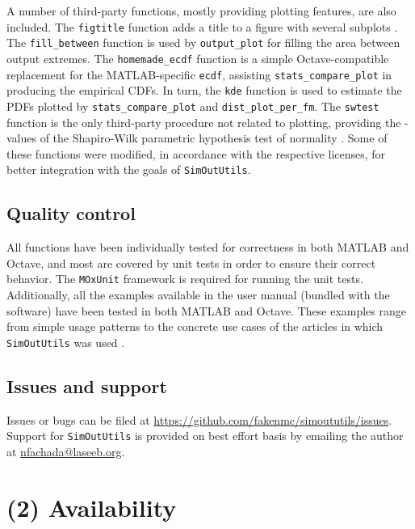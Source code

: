 \documentclass{article}
\newcommand{\progfunc}{\textnhtt}
\newcommand{\swpackage}{\texttt}
\begin{document}
A number of third-party functions, mostly providing plotting features, are also included. The \progfunc{figtitle} function adds a title to a figure with several subplots \cite{greene2013figtitle}. The \progfunc{fill\_between} function \cite{vincent2014fill} is used by \progfunc{output\_plot} for filling the area between output extremes. The \progfunc{homemade\_ecdf} function \cite{boutin2011homemade} is a simple Octave-compatible replacement for the MATLAB-specific \progfunc{ecdf}, assisting \progfunc{stats\_compare\_plot} in producing the empirical CDFs. In turn, the \progfunc{kde} function \cite{botev2010kernel} is used to estimate the PDFs plotted by \progfunc{stats\_compare\_plot} and \progfunc{dist\_plot\_per\_fm}. The \progfunc{swtest} function is the only third-party procedure not related to plotting, providing the -values of the Shapiro-Wilk parametric hypothesis test of normality \cite{saida2007shapiro}. Some of these functions were modified, in accordance with the respective licenses, for better integration with the goals of \swpackage{SimOutUtils}.

\subsection*{Quality control}

All functions have been individually tested for correctness in both MATLAB and Octave, and most are covered by unit tests in order to ensure their correct behavior. The \swpackage{MOxUnit} framework \cite{oosterhof2015} is required for running the unit tests. Additionally, all the examples available in the user manual (bundled with the software) have been tested in both MATLAB and Octave. These examples range from simple usage patterns to the concrete use cases of the articles in which \swpackage{SimOutUtils} was used \cite{fachada2015template,fachada2015parallelization,fachada2015model}.

\subsection*{Issues and support}

Issues or bugs can be filed at \url{https://github.com/fakenmc/simoututils/issues}. Support for \swpackage{SimOutUtils} is provided on best effort basis by emailing the author at \href{mailto:nfachada@laseeb.org}{nfachada@laseeb.org}.

\section*{(2) Availability}
\end{document}
